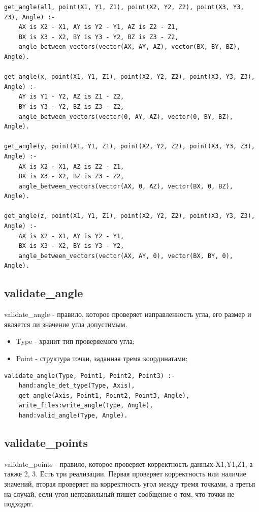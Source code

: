 \begin{lstlisting}[caption=Реализация правила get\_angle, label=rules:getangle]
get_angle(all, point(X1, Y1, Z1), point(X2, Y2, Z2), point(X3, Y3, Z3), Angle) :-
	AX is X2 - X1, AY is Y2 - Y1, AZ is Z2 - Z1,
	BX is X3 - X2, BY is Y3 - Y2, BZ is Z3 - Z2,
	angle_between_vectors(vector(AX, AY, AZ), vector(BX, BY, BZ), Angle).
	
get_angle(x, point(X1, Y1, Z1), point(X2, Y2, Z2), point(X3, Y3, Z3), Angle) :-
	AY is Y1 - Y2, AZ is Z1 - Z2,
	BY is Y3 - Y2, BZ is Z3 - Z2,
	angle_between_vectors(vector(0, AY, AZ), vector(0, BY, BZ), Angle).
	
get_angle(y, point(X1, Y1, Z1), point(X2, Y2, Z2), point(X3, Y3, Z3), Angle) :-
	AX is X2 - X1, AZ is Z2 - Z1,
	BX is X3 - X2, BZ is Z3 - Z2,
	angle_between_vectors(vector(AX, 0, AZ), vector(BX, 0, BZ), Angle).
	
get_angle(z, point(X1, Y1, Z1), point(X2, Y2, Z2), point(X3, Y3, Z3), Angle) :-
	AX is X2 - X1, AY is Y2 - Y1,
	BX is X3 - X2, BY is Y3 - Y2,
	angle_between_vectors(vector(AX, AY, 0), vector(BX, BY, 0), Angle).
\end{lstlisting}


\subsection{validate\_angle}
\hspace{0.6cm} validate\_angle - правило, которое проверяет направленность угла, его размер и является ли значение угла допустимым.

\begin{itemize}
	\item Type - хранит тип проверяемого угла;
	\item Point - структура точки, заданная тремя координатами;
\end{itemize}

\begin{lstlisting}[caption=Реализация правила validate\_angle, label=rules:validateangle]
validate_angle(Type, Point1, Point2, Point3) :-
	hand:angle_det_type(Type, Axis),
	get_angle(Axis, Point1, Point2, Point3, Angle),
	write_files:write_angle(Type, Angle),
	hand:valid_angle(Type, Angle).
\end{lstlisting}

\subsection{validate\_points}
\hspace{0.6cm} validate\_points - правило, которое проверяет корректность данных X1,Y1,Z1, а также 2, 3. Есть три реализации. Первая проверяет корректность или наличие значений, вторая проверяет на корректность угол между тремя точками, а третья на случай, если угол неправильный пишет сообщение о том, что точки не подходят.

